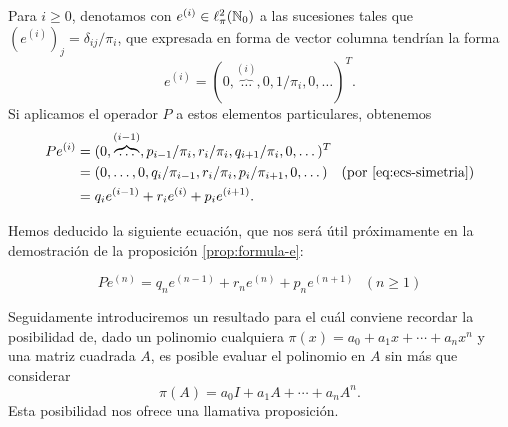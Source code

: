     Para $i\geq 0$, denotamos con $e^{(i)}\in\ell^2_\pi(\mathbb{N}_0)$ a las sucesiones tales que $(e^{(i)})_j = \delta_{ij}/\pi_i$, que expresada en forma de vector columna tendrían la forma
    $$
    e^{(i)}=(0,\overbrace{\dots}^{(i)},0,1/\pi_i,0,\dots)^T.
    $$
    Si aplicamos el operador $P$ a estos elementos particulares, obtenemos
    \begin{equation*}
        \begin{split}
            Pe^{(i)} &= (0,\overbrace{\dots}^{(i-1)}, p_{i-1}/\pi_i, r_i/\pi_i, q_{i+1}/\pi_i,0,\dots)^T \\
            &= (0,\dots,0, q_i/\pi_{i-1},  r_i/\pi_i, p_i/\pi_{i+1},0,\dots) \ \ \ \text{(por \eqref{eq:ecs-simetria})}\\
            &= q_i e^{(i-1)} + r_i e^{(i)} + p_i e^{(i+1)}.
        \end{split}
    \end{equation*}

    Hemos deducido la siguiente ecuación, que nos será útil próximamente en la demostración de la proposición \ref{prop:formula-e}:

    \begin{equation}
        \label{eq:Pen}
        Pe^{(n)} =  q_n e^{(n-1)} + r_n  e^{(n)} + p_n e^{(n+1)} \ \ \ (n\geq 1)
    \end{equation}

    Seguidamente introduciremos un resultado para el cuál conviene recordar la posibilidad de, dado un polinomio cualquiera $\pi(x)= a_0 + a_1 x + \cdots + a_n x^n$ y una matriz cuadrada $A$, es posible evaluar el polinomio en $A$ sin más que considerar
    $$
    \pi(A) = a_0 I + a_1 A + \cdots + a_n A^n.
    $$
    Esta posibilidad nos ofrece una llamativa proposición.

